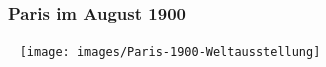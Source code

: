 \documentclass[aspectratio=1610,onlymath]{beamer}
\begin{document}
%



\begin{frame}\frametitle{Paris im August 1900}\label{frame_paris}

~\hfill
\texttt{[image: images/Paris-1900-Weltausstellung]}
\hfill~

\end{frame}
\end{document}
